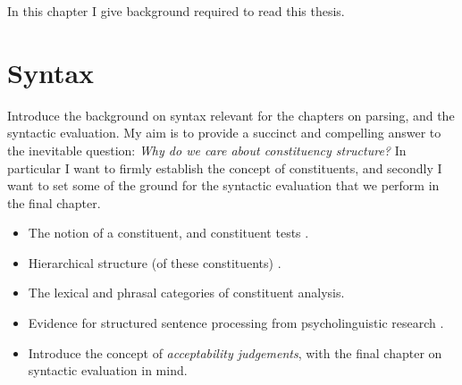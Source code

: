 % 

In this chapter I give background required to read this thesis.

\section{Syntax}
Introduce the background on syntax relevant for the chapters on parsing, and the syntactic evaluation. My aim is to provide a succinct and compelling answer to the inevitable question: \textit{Why do we care about constituency structure?} In particular I want to firmly establish the concept of constituents, and secondly I want to set some of the ground for the syntactic evaluation that we perform in the final chapter.
\begin{itemize}
  \item The notion of a constituent, and constituent tests \citet{carnie2010constituent,huddleston2002grammar}.
  \item Hierarchical structure (of these constituents) \citet{Everaert+2015:structures}.
  \item The lexical and phrasal categories of constituent analysis.
  \item Evidence for structured sentence processing from psycholinguistic research \citep{hale2001earley,levy2008expectation,brennan2016abstract}.
  \item Introduce the concept of \textit{acceptability judgements}, with the final chapter on syntactic evaluation in mind.
\end{itemize}


